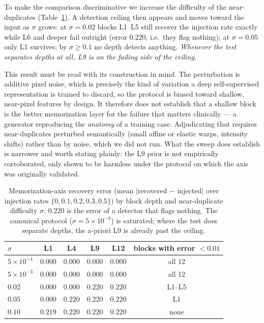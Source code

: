 \documentclass[lettersize,journal]{IEEEtran}
\begin{document}
To make the comparison discriminative we increase the difficulty of the
near-duplicates (Table~\ref{tab:depth_mem}). A detection ceiling then appears
and moves toward the input as $\sigma$ grows: at $\sigma = 0.02$ blocks L1--L5
still recover the injection rate exactly while L6 and deeper fail outright
(error $0.220$, i.e.\ they flag nothing); at $\sigma = 0.05$ only L1 survives;
by $\sigma \ge 0.1$ no depth detects anything. \emph{Whenever the test
separates depths at all, L9 is on the failing side of the ceiling.}

This result must be read with its construction in mind. The perturbation is
additive pixel noise, which is precisely the kind of variation a deep
self-supervised representation is trained to discard, so the protocol is biased
toward shallow, near-pixel features by design. It therefore does not establish
that a shallow block is the better memorization layer for the failure that
matters clinically --- a generator reproducing the \emph{anatomy} of a training
case. Adjudicating that requires near-duplicates perturbed semantically
(small affine or elastic warps, intensity shifts) rather than by noise, which
we did not run. What the sweep does establish is narrower and worth stating
plainly: the L9 prior is not empirically corroborated, only shown to be
harmless under the protocol on which the axis was originally validated.

\begin{table}[t]
\centering
\caption{%
  Memorization-axis recovery error (mean $|$recovered $-$ injected$|$ over
  injection rates $\{0,0.1,0.2,0.3,0.5\}$) by block depth and near-duplicate
  difficulty $\sigma$. $0.220$ is the error of a detector that flags nothing.
  The canonical protocol ($\sigma = 5\times10^{-4}$) is saturated; where the
  test does separate depths, the a-priori L9 is already past the ceiling.
}
\label{tab:depth_mem}
\setlength{\tabcolsep}{4pt}
\begin{tabular}{lccccc}
\toprule
$\sigma$ & L1 & L4 & \textbf{L9} & L12 & blocks with error $<0.01$ \\
\midrule
$5\times10^{-4}$ & $0.000$ & $0.000$ & $\mathbf{0.000}$ & $0.000$ & all 12 \\
$5\times10^{-3}$ & $0.000$ & $0.000$ & $\mathbf{0.000}$ & $0.000$ & all 12 \\
$0.02$           & $0.000$ & $0.000$ & $\mathbf{0.220}$ & $0.220$ & L1--L5 \\
$0.05$           & $0.000$ & $0.220$ & $\mathbf{0.220}$ & $0.220$ & L1 \\
$0.10$           & $0.219$ & $0.220$ & $\mathbf{0.220}$ & $0.220$ & none \\
\bottomrule
\end{tabular}
\end{table}
\end{document}
